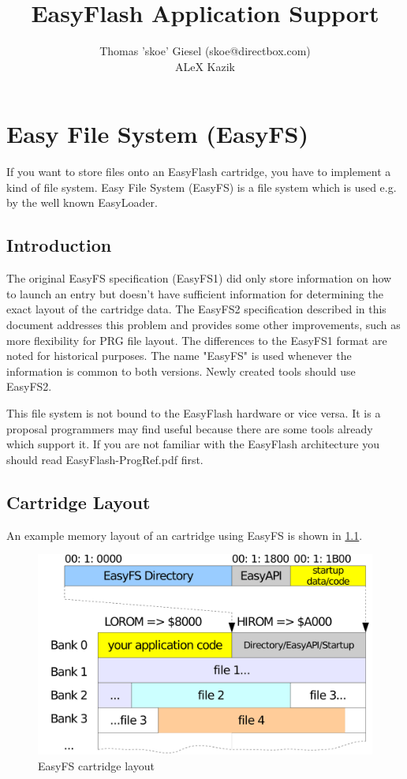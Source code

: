 \documentclass[a4paper,oneside]{memoir}
\title{EasyFlash Application Support}
\author{
Thomas 'skoe' Giesel (skoe@directbox.com) \\
ALeX Kazik
}
\begin{document}
\hsize
\maketitle

\tableofcontents

\chapter{Easy File System (EasyFS)}

If you want to store files onto an EasyFlash cartridge, you have to implement a
kind of file system. Easy File System (EasyFS) is a file system which is used
e.g. by the well known EasyLoader.

\section{Introduction}

The original EasyFS specification (EasyFS1) did only store information on how to
launch an entry but doesn't have sufficient information
for determining the exact layout of the cartridge data.
The EasyFS2 specification described in this document addresses this problem and
provides some other improvements, such as more flexibility for PRG file layout.
The differences to the EasyFS1 format are noted for historical purposes.
The name "EasyFS" is used whenever the information is common to both versions.
Newly created tools should use EasyFS2.

This file system is not bound to the EasyFlash hardware or vice versa. It is a
proposal programmers may find useful because there are some tools already which
support it. If you are not familiar with the EasyFlash architecture you should
read EasyFlash-ProgRef.pdf first.

\section{Cartridge Layout}

An example memory layout of an cartridge using EasyFS is shown in \ref{fig:easyfs}.

\begin{figure}[!htbp]
    \centering
    \includegraphics[scale=0.04]{src/easyfs.pdf}
    \caption{EasyFS cartridge layout}
    \label{fig:easyfs}
\end{figure}
\end{document}
